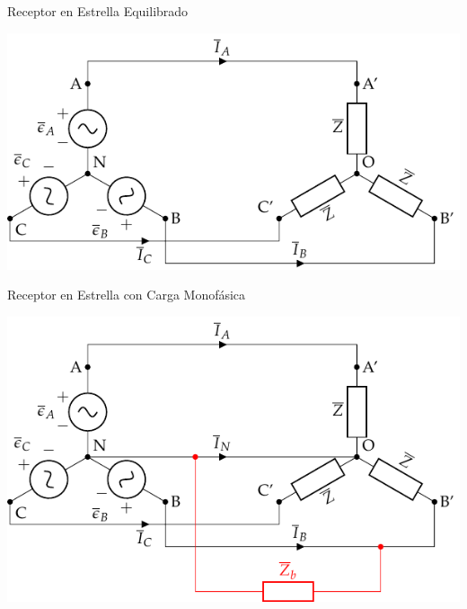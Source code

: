 \documentclass[aspectratio=169, usenames,svgnames,dvipsnames]{beamer}
\begin{document}
\begin{frame}[label={sec:orga2490dd}]{Receptor en Estrella Equilibrado}
\begin{center}
\includegraphics[width=.9\linewidth]{../figs/EstrellaEquilibrado_SinNeutro.pdf}
\end{center}
\end{frame}

\begin{frame}[label={sec:org37615ef}]{Receptor en Estrella con Carga Monofásica}
\begin{center}
\includegraphics[height=0.9\textheight]{../figs/Estrella_CargaMonofasica.pdf}
\end{center}
\end{frame}
\end{document}

